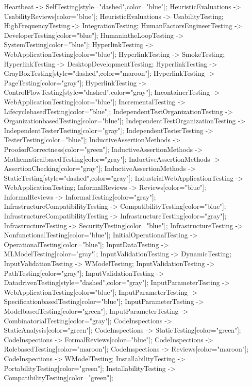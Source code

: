 \documentclass{article}
\begin{document}
{Heartbeat -> SelfTesting[style="dashed",color="blue"];
HeuristicEvaluations -> UsabilityReviews[color="blue"];
HeuristicEvaluations -> UsabilityTesting;
HighFrequencyTesting -> IntegrationTesting;
HumanFactorsEngineerTesting -> DeveloperTesting[color="blue"];
HumanintheLoopTesting -> SystemTesting[color="blue"];
HyperlinkTesting -> WebApplicationTesting[color="blue"];
HyperlinkTesting -> SmokeTesting;
HyperlinkTesting -> DesktopDevelopmentTesting;
HyperlinkTesting -> GrayBoxTesting[style="dashed",color="maroon"];
HyperlinkTesting -> PageTesting[color="gray"];
HyperlinkTesting -> ControlFlowTesting[style="dashed",color="gray"];
IncontainerTesting -> WebApplicationTesting[color="blue"];
IncrementalTesting -> LifecyclebasedTesting[color="blue"];
IndependentTestOrganizationTesting -> OrganizationbasedTesting[color="blue"];
IndependentTestOrganizationTesting -> IndependentTesterTesting[color="gray"];
IndependentTesterTesting -> TesterTesting[color="blue"];
InductiveAssertionMethods -> ProofsofCorrectness[color="green"];
InductiveAssertionMethods -> MathematicalbasedTesting[color="gray"];
InductiveAssertionMethods -> AssertionChecking[color="gray"];
InductiveAssertionMethods -> StaticTesting[style="dashed",color="gray"];
IndustrialWebApplicationTesting -> WebApplicationTesting;
InformalReviews -> Reviews[color="blue"];
InformalReviews -> InformalTesting[color="gray"];
InfrastructureCompatibilityTesting -> CompatibilityTesting[color="blue"];
InfrastructureCompatibilityTesting -> InfrastructureTesting[color="gray"];
InfrastructureTesting -> SecurityTesting[color="blue"];
InfrastructureTesting -> NonfunctionalTesting[color="blue"];
InitialOperationalTesting -> OperationalTesting[color="blue"];
InputDataTesting -> MLModelTesting[color="gray"];
InputValidationTesting -> DynamicTesting;
InputValidationTesting -> WModelTesting;
InputValidationTesting -> PathTesting[color="gray"];
InputValidationTesting -> DatadrivenTesting[style="dashed",color="gray"];
InputParameterTesting -> WebApplicationTesting[color="blue"];
InputParameterTesting -> SpecificationbasedTesting[color="blue"];
InputParameterTesting -> ModelbasedTesting[color="green"];
InputParameterTesting -> CombinatorialTesting[color="gray"];
CodeInspections -> StaticAnalysis[color="green"];
CodeInspections -> StaticTesting[color="green"];
CodeInspections -> FormalReviews[color="blue"];
CodeInspections -> RolebasedTesting[color="maroon"];
CodeInspections -> Reviews[color="maroon"];
CodeInspections -> WModelTesting;
InstallabilityTesting -> PortabilityTesting[color="green"];
InstallabilityTesting -> CompatibilityTesting[color="green"];
}
\end{document}
